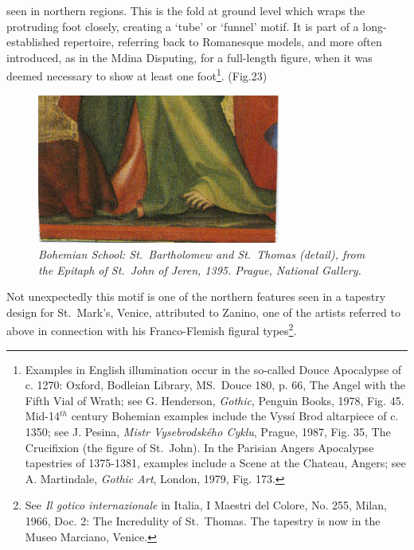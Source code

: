 \documentclass[a4paper,12pt]{article}
\begin{document}
seen in northern regions. This is the fold at ground level which wraps
the protruding foot closely, creating a `tube' or `funnel' motif. It
is part of a long-established repertoire, referring back to Romanesque
models, and more often introduced, as in the Mdina Disputing, for a
full-length figure, when it was deemed necessary to show at least one
foot\footnote{Examples in English illumination occur in the so-called
Douce Apocalypse of c. 1270: Oxford, Bodleian Library, MS.~Douce 180,
p. 66, The Angel with the Fifth Vial of Wrath; see G. Henderson,
\textit{Gothic}, Penguin Books, 1978, Fig. 45.  Mid-14$^{th}$ century
Bohemian examples include the Vyss\'i Brod altarpiece of c. 1350; see
J. Pesina, \textit{Mistr Vysebrodsk\'eho Cyklu}, Prague, 1987, Fig. 35,
The Crucifixion (the figure of St.~John). In the Parisian Angers
Apocalypse tapestries of 1375-1381, examples include a Scene at the
Chateau, Angers; see A. Martindale, \textit{Gothic Art}, London, 1979,
Fig. 173.}. (Fig.23) 
\begin{figure}[htbp]
\centering
\includegraphics[width=8cm]{pics/fig23.png}
\caption[Bohemian School: St.~Bartholomew and St.~Thomas (detail)] 
{\it Bohemian School: St.~Bartholomew and St.~Thomas (detail), from the
Epitaph of St.~John of Jeren, 1395.  Prague, National Gallery.}
\end{figure}
Not unexpectedly this motif is one of the
northern features seen in a tapestry design for St.~Mark's, Venice,
attributed to Zanino, one of the artists referred to above in
connection with his Franco-Flemish figural types\footnote{See
\textit{Il gotico internazionale} in Italia, I Maestri del Colore,
No. 255, Milan, 1966, Doc. 2: The Incredulity of St.~Thomas. The
tapestry is now in the Museo Marciano, Venice.}.
\end{document}
